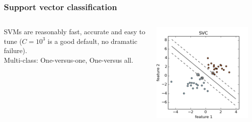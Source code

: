 \begin{frame}
\frametitle{Support vector classification}
\begin{columns}[c]
 SVMs are reasonably fast, accurate and easy to
tune ($C=10^3$ is a good default, no dramatic failure).\\

Multi-class: One-versus-one, One-versus all.

\par
\includegraphics[width=\textwidth]{sklearn_material/plot_separating_hyperplane_0011.png}
\end{columns}
\end{frame}



